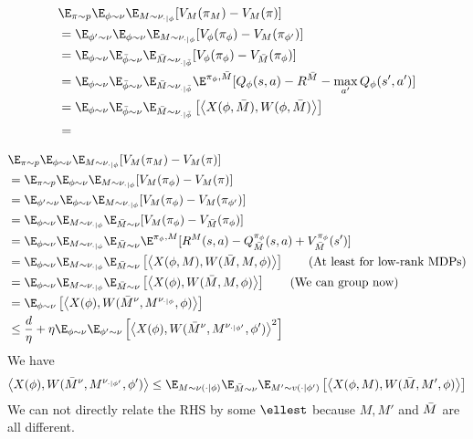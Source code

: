 \begin{align*}
&\E_{\pi\sim p}\E_{\phi\sim\nu}\E_{M\sim\nu_{\cdot|\phi}}[V_M(\pi_{M})-V_{M}(\pi)]  
\\&= \E_{\phi'\sim \nu}\E_{\phi\sim\nu}\E_{M\sim\nu_{\cdot|\phi}}[V_{\phi}(\pi_{\phi})-V_{M}(\pi_{\phi'})]  
\\&= \E_{\phi\sim \nu}\E_{\bar{\phi}\sim\nu}\E_{\bar{M}\sim\nu_{\cdot|\bar{\phi}}}[V_{\phi}(\pi_{\phi})-V_{\bar{M}}(\pi_{\phi})]  
\\&= \E_{\phi\sim \nu}\E_{\bar{\phi}\sim\nu}\E_{\bar{M}\sim\nu_{\cdot|\bar{\phi}}}\E^{\pi_\phi, \bar{M}}[Q_\phi(s,a) - R^{\Bar{M}} - \max_{a'}Q_{\phi}(s', a')] 
\\&= \E_{\phi\sim \nu}\E_{\bar{\phi}\sim\nu}\E_{\bar{M}\sim\nu_{\cdot|\bar{\phi}}}\left[\left\langle X(\phi, \bar{M}), W(\phi, \Bar{M})\right\rangle\right]
\\&= 
\end{align*}



\begin{align*}
&\E_{\pi\sim p}\E_{\phi\sim\nu}\E_{M\sim\nu_{\cdot|\phi}}[V_M(\pi_{M})-V_{M}(\pi)] 
\\&= \E_{\pi\sim p}\E_{\phi\sim\nu}\E_{M\sim\nu_{\cdot|\phi}}[V_M(\pi_{\phi})-V_{M}(\pi)]  
\\&= \E_{\phi'\sim \nu}\E_{\phi\sim\nu}\E_{M\sim\nu_{\cdot|\phi}}[V_{M}(\pi_{\phi})-V_{M}(\pi_{\phi'})]  
\\&=  \E_{\phi\sim\nu}\E_{M\sim\nu_{\cdot|\phi}}\E_{\bar{M} \sim \nu}[V_{M}(\pi_{\phi})-V_{\bar{M}}(\pi_{\phi})]  
\\&= \E_{\phi\sim\nu}\E_{M\sim\nu_{\cdot|\phi}}\E_{\bar{M} \sim \nu}\E^{\pi_\phi, M}[ R^{M}(s,a)  - Q_{\bar{M}}^{\pi_{\phi}}(s,a) + V_{\bar{M}}^{\pi_{\phi}}(s')] 
\\&= \E_{\phi\sim\nu}\E_{M\sim\nu_{\cdot|\phi}}\E_{\bar{M} \sim \nu}\left[\left\langle X(\phi, M), W(\Bar{M}, M, \phi)\right\rangle\right] \tag{At least for low-rank MDPs}
\\&= \E_{\phi\sim\nu}\E_{M\sim\nu_{\cdot|\phi}}\E_{\bar{M} \sim \nu}\left[\left\langle X(\phi), W(\Bar{M}, M, \phi)\right\rangle\right] \tag{We can group now}
\\&= \E_{\phi\sim\nu}\left[\left\langle X(\phi), W(\Bar{M}^{\nu}, M^{\nu_{\cdot|\phi}}, \phi)\right\rangle\right]
\\&\le \frac{d}{\eta} + \eta \E_{\phi \sim \nu}\E_{\phi' \sim \nu}\left[\left\langle X(\phi),  W(\Bar{M}^{\nu}, M^{\nu_{\cdot|\phi'}}, \phi')\right\rangle^2\right]
\end{align*}
We have
\begin{align*}
    \left\langle X(\phi),  W(\Bar{M}^{\nu}, M^{\nu_{\cdot|\phi'}}, \phi')\right\rangle \le \E_{M \sim \nu(\cdot|\phi)}\E_{\Bar{M} \sim \nu}\E_{M' \sim v(\cdot|\phi')}\left[\left\langle X(\phi, M), W(\Bar{M}, M', \phi)\right\rangle\right]
\end{align*}
We can not directly relate the RHS by some $\ellest$ because $M, M'$ and $\Bar{M}$ are all different. 

